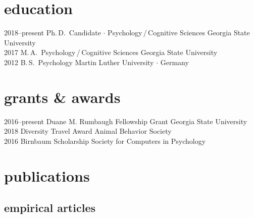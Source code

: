 \documentclass[]{friggeri-cv}
\begin{document}
\section{education}

\begin{entrylist}
  \entry
    {2018--present}
    {Ph.\,D.~Candidate $\cdot$ Psychology\,/\,Cognitive Sciences}
    {Georgia State University}
    {\\[-.7cm]}
 \entry
   {2017}
   {M.\,A.~Psychology\,/\,Cognitive Sciences}
   {Georgia State University}
   {\\[-.7cm]}
  \entry
    {2012}
    {B.\,S.~Psychology}
    {Martin Luther University $\cdot$ Germany}
    {\\[-.7cm]}
\end{entrylist}


\section{grants \& awards}

\begin{entrylist}
  \entry
    {2016--present}
    {Duane M. Rumbaugh Fellowship Grant}
    {Georgia State University}
    {\\[-.7cm]}
  \entry
    {2018}
    {Diversity Travel Award}
    {Animal Behavior Society}
    {\\[-.7cm]}
  \entry
    {2016}
    {Birnbaum Scholarship}
    {Society for Computers in Psychology}
    {\\[-.7cm]}
\end{entrylist}


\section{publications}



\subsection{empirical articles}
\end{document}
